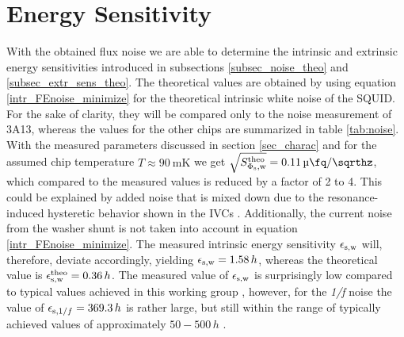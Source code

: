 \section{Energy Sensitivity}

With the obtained flux noise we are able to determine the intrinsic and extrinsic energy sensitivities introduced in subsections \ref{subsec_noise_theo} and \ref{subsec_extr_sens_theo}. The theoretical values are obtained by using equation \ref{intr_FEnoise_minimize} for the theoretical intrinsic white noise of the SQUID. For the sake of clarity, they will be compared only to the noise measurement of 3A13, whereas the values for the other chips are summarized in table \ref{tab:noise}. With the measured parameters discussed in section \ref{sec_charac} and for the assumed chip temperature $T\approx \qty{90}{\milli\kelvin}$ we get $\sqrt{S_{\rm \Phi_{\rm s},w}^{\rm theo}}=\qty{0.11}{\micro\fq\per\sqrthz}$, which compared to the measured values is reduced by a factor of 2 to 4. This could be explained by added noise that is mixed down due to the resonance-induced hysteretic behavior shown in the IVCs \cite{Kempf2015}. Additionally, the current noise from the washer shunt is not taken into account in equation \ref{intr_FEnoise_minimize}. The measured intrinsic energy sensitivity $\epsilon_{\rm s,w}$ will, therefore, deviate accordingly, yielding $\epsilon_{\rm s,w}=1.58\, h$, whereas the theoretical value is $\epsilon_{\rm s,w}^{\rm theo}=0.36\, h$. The measured value of $\epsilon_{\rm s,w}$ is surprisingly low compared to typical values achieved in this working group \cite{Kempf2015}, however, for the \textit{1/f} noise the value of $\epsilon_{{\rm s},1/f}=369.3\, h$ is rather large, but still within the range of typically achieved values of approximately $50-500\, h$ \cite{Kempf2016}. 

